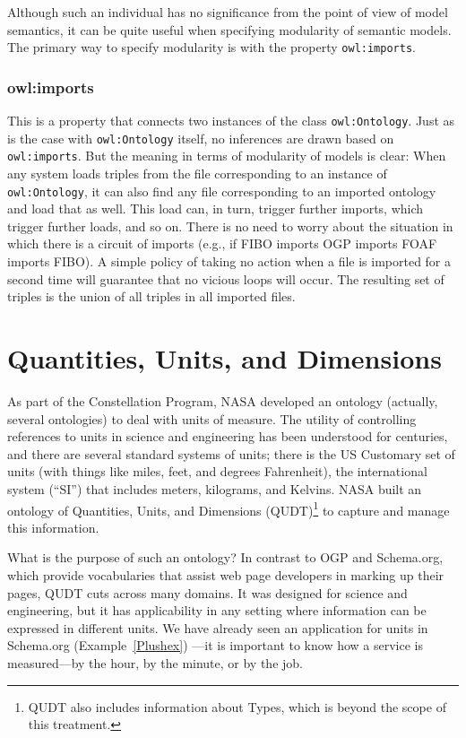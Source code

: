 Although such an individual has no significance from the point of view
of model semantics, it can
be quite useful when specifying modularity of semantic models. The
primary way to specify modularity is with the property \texttt{owl:imports}.

\subsubsection{owl:imports}

This is a property that connects two instances of the class
\texttt{owl:Ontology}. Just as is the case with \texttt{owl:Ontology} itself, no
inferences are drawn based on \texttt{owl:imports}. But the meaning in terms of
modularity of models is clear: When any system loads triples from the
file corresponding to an instance of \texttt{owl:Ontology}, it can also find any
file corresponding to an imported ontology and load that as well. This
load can, in turn, trigger further imports, which trigger further loads,
and so on. There is no need to worry about the situation in which there
is a circuit of imports (e.g., if FIBO imports OGP imports FOAF imports FIBO).
A simple policy of taking no action when a file is imported for a second
time will guarantee that no vicious loops will occur. The resulting set
of triples is the union of all triples in all imported files.




\section{Quantities, Units, and Dimensions}
\label{QUDT}

As part of the Constellation Program, NASA developed an ontology 
(actually, several ontologies) to deal
with units of measure. The utility of controlling references to units in
science and engineering has been understood for centuries, and there are
several standard systems of units; there is the US Customary set of
units (with things like miles, feet, and degrees Fahrenheit), the
international system (``SI'') that includes meters, kilograms, and
Kelvins. NASA built an ontology of Quantities, Units, and Dimensions
(QUDT)\footnote{QUDT also includes information about Types, which is beyond the scope
of this treatment.}
to capture and manage this information.

What is the purpose of such an ontology? In contrast to OGP and Schema.org, 
which provide vocabularies that assist web page developers in
marking up their pages, QUDT cuts across many domains. It was designed
for science and engineering, but it has applicability in any setting
where information can be expressed in different units. We have already
seen an application for units in Schema.org (Example~\ref{Plushex}) 
---it is
important to know how a service is measured---by the hour, by the
minute, or by the job.

